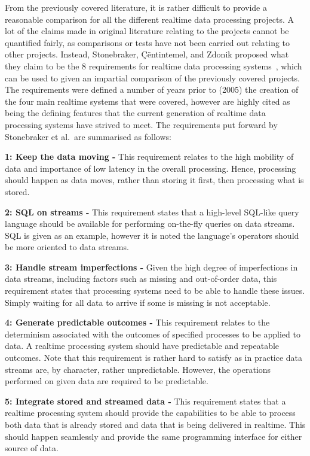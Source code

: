 \documentclass[a4paper,11pt]{article}
\begin{document}
From the previously covered literature, it is rather difficult to provide a reasonable comparison for all the different
realtime data processing projects. A lot of the claims made in original literature relating to the projects cannot be
quantified fairly, as comparisons or tests have not been carried out relating to other projects. Instead, Stonebraker,
\c{C}\~entintemel, and Zdonik proposed what they claim to be the 8 requirements for realtime data processing systems~\cite{stonebraker_8_2005},
which can be used to given an impartial comparison of the previously covered projects. The requirements were defined a
number of years prior to (2005) the creation of the four main realtime systems that were covered, however are highly
cited as being the defining features that the current generation of realtime data processing systems have strived to meet.
The requirements put forward by Stonebraker et al.\ are summarised as follows:

\noindent \textbf{1: Keep the data moving -} This requirement relates to the high mobility of data and importance of low
latency in the overall processing. Hence, processing should happen as data moves, rather than storing it first, then
processing what is stored.

\noindent \textbf{2: SQL on streams -} This requirement states that a high-level SQL-like query language should be
available for performing on-the-fly queries on data streams. SQL is given as an example, however it is noted the language's
operators should be more oriented to data streams.

\noindent \textbf{3: Handle stream imperfections -} Given the high degree of imperfections in data streams, including
factors such as missing and out-of-order data, this requirement states that processing systems need to be able to handle
these issues. Simply waiting for all data to arrive if some is missing is not acceptable.

\noindent \textbf{4: Generate predictable outcomes -} This requirement relates to the determinism associated with the
outcomes of specified processes to be applied to data. A realtime processing system should have predictable and repeatable
outcomes. Note that this requirement is rather hard to satisfy as in practice data streams are, by character, rather
unpredictable. However, the operations performed on given data are required to be predictable.

\noindent \textbf{5: Integrate stored and streamed data -} This requirement states that a realtime processing system
should provide the capabilities to be able to process both data that is already stored and data that is being delivered
in realtime. This should happen seamlessly and provide the same programming interface for either source of data.
\end{document}
